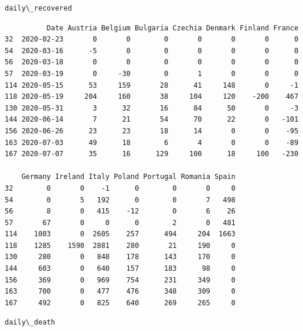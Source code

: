 \documentclass[a4paper]{article}
\begin{document}
    
    \begin{Verbatim}[commandchars=\\\{\}]
daily\_recovered
    \end{Verbatim}

    
    \begin{verbatim}
          Date Austria Belgium Bulgaria Czechia Denmark Finland France
32  2020-02-23       0       0        0       0       0       0      0   
54  2020-03-16      -5       0        0       0       0       0      0   
56  2020-03-18       0       0        0       0       0       0      0   
57  2020-03-19       0     -30        0       1       0       0      0   
114 2020-05-15      53     159       28      41     148       0     -1   
118 2020-05-19     204     160       38     104     120    -200    467   
130 2020-05-31       3      32       16      84      50       0     -3   
144 2020-06-14       7      21       54      70      22       0   -101   
156 2020-06-26      23      23       18      14       0       0    -95   
163 2020-07-03      49      18        6       4       0       0    -89   
167 2020-07-07      35      16      129     100      18     100   -230   

    Germany Ireland Italy Poland Portugal Romania Spain  
32        0       0    -1      0        0       0     0  
54        0       5   192      0        0       7   498  
56        8       0   415    -12        0       6    26  
57       67       0     0      0        2       0   481  
114    1003       0  2605    257      494     204  1663  
118    1285    1590  2881    280       21     190     0  
130     280       0   848    178      143     170     0  
144     603       0   640    157      183      98     0  
156     369       0   969    754      231     349     0  
163     700       0   477    476      348     309     0  
167     492       0   825    640      269     265     0  
    \end{verbatim}

    
    \begin{Verbatim}[commandchars=\\\{\}]
daily\_death
    \end{Verbatim}
\end{document}
